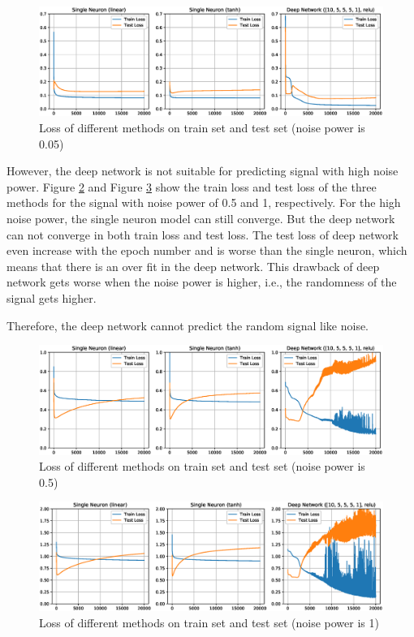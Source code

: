 \documentclass[10pt]{article}
\begin{document}
\begin{figure}[H]
    \centering
	\includegraphics[width=1\textwidth]{fig/4.7_3.eps}

    \caption{Loss of different methods on train set and test set (noise power is 0.05)}
    \label{fig35}
\end{figure}

However, the deep network is not suitable for predicting signal with high noise power.
Figure \ref{fig36} and Figure \ref{fig37} show the train loss and test loss of 
the three methods for the signal with noise power of 0.5 and 1, respectively.
For the high noise power, the single neuron model can still converge. But the deep network 
can not converge in both train loss and test loss. The test loss of deep network even 
increase with the epoch number and is worse than the single neuron, which means that 
there is an over fit in the deep network. This drawback of deep network gets worse when the noise power is higher,
i.e., the randomness of the signal gets higher.

Therefore, the deep network cannot predict the random signal like noise.

\begin{figure}[H]
    \centering
	\includegraphics[width=1\textwidth]{fig/4.8_1.eps}

    \caption{Loss of different methods on train set and test set (noise power is 0.5)}
    \label{fig36}
\end{figure}

\begin{figure}[H]
    \centering
	\includegraphics[width=1\textwidth]{fig/4.8_2.eps}

    \caption{Loss of different methods on train set and test set (noise power is 1)}
    \label{fig37}
\end{figure}
\end{document}
